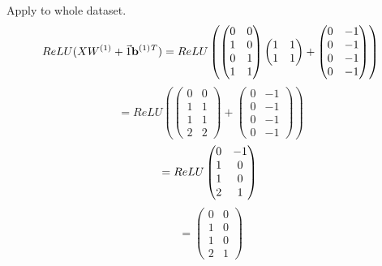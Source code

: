 \begin{example}
    Apply to whole dataset.\\
    \begin{equation*}
         ReLU(XW^{(1)} + \Vec{1}\vb^{(1)}{}^T) = ReLU \left(
        \begin{pmatrix}
        0 & 0\\
        1 & 0\\
        0 & 1\\
        1 & 1
        \end{pmatrix} 
        \begin{pmatrix}
        1 & 1\\
        1 & 1
        \end{pmatrix} + 
        \begin{pmatrix}
        0 & -1\\
        0 & -1\\
        0 & -1\\
        0 & -1
        \end{pmatrix} \right)
    \end{equation*}
    \begin{equation*}  
        = ReLU \left(
        \begin{pmatrix}
        0 & 0\\
        1 & 1\\
        1 & 1\\
        2 & 2
        \end{pmatrix} 
        + \begin{pmatrix}
        0 & -1\\
        0 & -1\\
        0 & -1\\
        0 & -1
        \end{pmatrix} \right)
    \end{equation*}
    \begin{equation*}  
        = ReLU\begin{pmatrix}
        0 & -1\\
        1 & 0\\
        1 & 0\\
        2 & 1
        \end{pmatrix}\\
    \end{equation*}
    \begin{equation*}
        = \begin{pmatrix}
        0 & 0\\
        1 & 0\\
        1 & 0\\
        2 & 1
        \end{pmatrix}
    \end{equation*}



\end{example}
